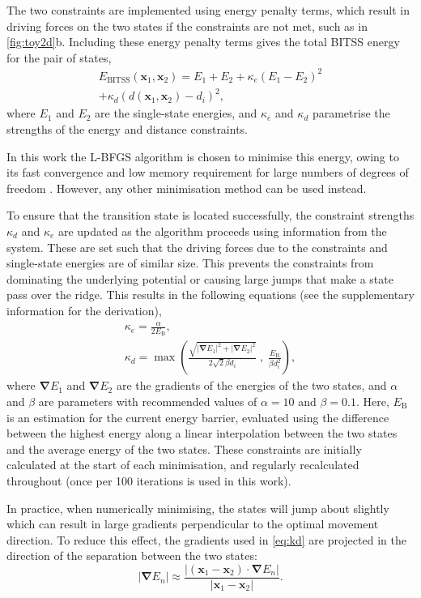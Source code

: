 \documentclass[twocolumn,10pt]{revtex4}
\newcommand{\bm}[1]{\boldsymbol{\mathbf{#1}}}
\newcommand{\abs}[1]{\left| #1 \right|}
\newcommand{\grad}{\bm{\nabla}}
\begin{document}
The two constraints are implemented using energy penalty terms, which result in driving forces on the two states if the constraints are not met, such as in \cref{fig:toy2d}b.
Including these energy penalty terms gives the total BITSS energy for the pair of states,
\begin{multline}\label{eq:bitss}
  E_\mathrm{BITSS}(\bm{x}_1, \bm{x}_2) = E_1 + E_2
    + \kappa_e \left( E_1 - E_2 \right) ^2 \\
    + \kappa_d \left( d(\bm{x}_1, \bm{x}_2) - d_i \right) ^2,
\end{multline}
where $E_1$ and $E_2$ are the single-state energies, and $\kappa_e$ and $\kappa_d$ parametrise the strengths of the energy and distance constraints.

In this work the L-BFGS algorithm is chosen to minimise this energy, owing to its fast convergence and low memory requirement for large numbers of degrees of freedom \cite{Liu1989}.
However, any other minimisation method can be used instead.

To ensure that the transition state is located successfully, the constraint strengths $\kappa_d$ and $\kappa_e$ are updated as the algorithm proceeds using information from the system.
These are set such that the driving forces due to the constraints and single-state energies are of similar size.
This prevents the constraints from dominating the underlying potential or causing large jumps that make a state pass over the ridge.
This results in the following equations (see the supplementary information for the derivation),
\begin{gather}
  \kappa_e = \frac {\alpha} {2 E_\mathrm{B}},
  \label{eq:ke}
  \\
  \kappa_d = \max \left(
    \frac {\sqrt{\abs{\grad E_1}^2 + \abs{\grad E_2}^2}} {2\sqrt{2} \beta d_i} \; , \;
    \frac{E_\mathrm{B}}{\beta d_i^2} \right),
  \label{eq:kd}
\end{gather}
where $\grad E_1$ and $\grad E_2$ are the gradients of the energies of the two states, and $\alpha$ and $\beta$ are parameters with recommended values of $\alpha = 10$ and $\beta = 0.1$.
Here, $E_\mathrm{B}$ is an estimation for the current energy barrier, evaluated using the difference between the highest energy along a linear interpolation between the two states and the average energy of the two states.
These constraints are initially calculated at the start of each minimisation, and regularly recalculated throughout (once per 100 iterations is used in this work).

In practice, when numerically minimising, the states will jump about slightly which can result in large gradients perpendicular to the optimal movement direction.
To reduce this effect, the gradients used in \cref{eq:kd} are projected in the direction of the separation between the two states:
\begin{equation}
  \abs{\grad E_n} \approx \frac {\abs{(\bm{x}_1 - \bm{x}_2) \cdot \grad E_n}} {\abs{\bm{x}_1 - \bm{x}_2}}.
\end{equation}
\end{document}
